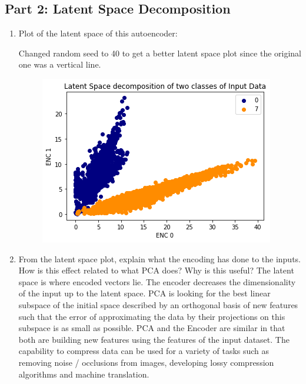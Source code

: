 \subsection{Part 2: Latent Space Decomposition }
\begin{enumerate}
    \item Plot of the latent space of this autoencoder:
    
    Changed random seed to 40 to get a better latent space plot since the original one was a vertical line.
    \begin{figure}[H]
      \centering
         \includegraphics[scale=0.8]{templates/latent1}
    \end{figure}

    \item From the latent space plot, explain what the encoding has done to the inputs. How is this effect related to what PCA does? Why is this useful?
    \newline\newline
    The latent space is where encoded vectors lie. The encoder decreases the dimensionality of the input up to the latent space. PCA is looking for the best linear subspace of the initial space described by an orthogonal basis of new features such that the error of approximating the data by their projections on this subspace is as small as possible. 
	\newline \newline
	PCA and the Encoder are similar in that both are building new features using the features of the input dataset. The capability to compress data can be used for a variety of tasks such as removing noise / occlusions from images, developing lossy compression algorithms and machine translation.

\end{enumerate}

